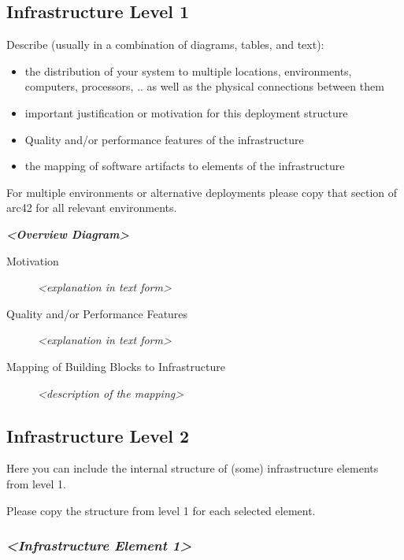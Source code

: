 \documentclass[]{article}
\begin{document}
\hypertarget{_infrastructure_level_1}{%
\subsection{Infrastructure Level 1}\label{_infrastructure_level_1}}

Describe (usually in a combination of diagrams, tables, and text):

\begin{itemize}
\item
  the distribution of your system to multiple locations, environments,
  computers, processors, .. as well as the physical connections between
  them
\item
  important justification or motivation for this deployment structure
\item
  Quality and/or performance features of the infrastructure
\item
  the mapping of software artifacts to elements of the infrastructure
\end{itemize}

For multiple environments or alternative deployments please copy that
section of arc42 for all relevant environments.

\emph{\textbf{\textless{}Overview Diagram\textgreater{}}}

\begin{description}
\item[Motivation]
\emph{\textless{}explanation in text form\textgreater{}}
\item[Quality and/or Performance Features]
\emph{\textless{}explanation in text form\textgreater{}}
\item[Mapping of Building Blocks to Infrastructure]
\emph{\textless{}description of the mapping\textgreater{}}
\end{description}

\hypertarget{_infrastructure_level_2}{%
\subsection{Infrastructure Level 2}\label{_infrastructure_level_2}}

Here you can include the internal structure of (some) infrastructure
elements from level 1.

Please copy the structure from level 1 for each selected element.

\hypertarget{__emphasis_infrastructure_element_1_emphasis}{%
\subsubsection{\texorpdfstring{\emph{\textless{}Infrastructure Element
1\textgreater{}}}{\textless{}Infrastructure Element 1\textgreater{}}}\label{__emphasis_infrastructure_element_1_emphasis}}
\end{document}
